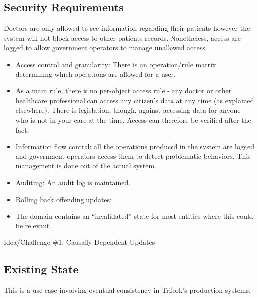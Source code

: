 \documentclass[11pt,a4paper]{report}
\begin{document}
\subsection{Security Requirements}
Doctors are only allowed to see information regarding their patients however the system will not block access to other patients records. Nonetheless, access are logged to allow government operators to manage unallowed access.
\begin{itemize}
\item Access control and granularity: There is an operation/rule matrix determining which operations are allowed for a user.
\item As a main rule, there is no per-object access rule - any doctor or other healthcare professional can access any citizen's data at any time (as explained elsewhere). There is legislation, though, against accessing data for anyone who is not in your care at the time. Access can therefore be verified after-the-fact.
\item Information flow control: all the operations produced in the system are logged and government operators access them to detect problematic behaviors. This management is done out of the actual system. 
\item Auditing: An audit log is maintained.
\item Rolling back offending updates:
\item The domain contains an ``invalidated'' state for most entities where this could be relevant.
\end{itemize}
Idea/Challenge \#1, Causally Dependent Updates

\subsection{Existing State}
This is a use case involving eventual consistency in Trifork's production systems.
\end{document}
